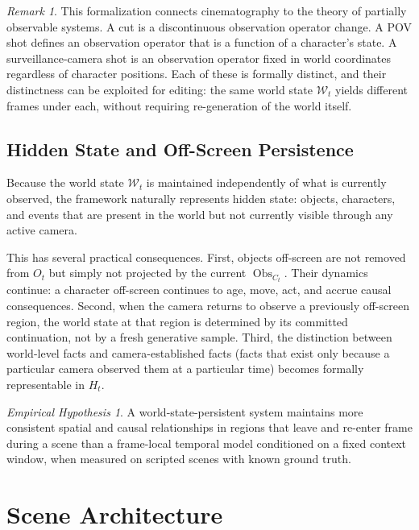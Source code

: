 \documentclass[11pt,a4paper]{article}
\theoremstyle{plain}
\theoremstyle{definition}
\theoremstyle{remark}
\newtheorem{remark}[theorem]{Remark}
\newtheorem{hypothesis}[theorem]{Empirical Hypothesis}
\DeclareMathOperator{\Obs}{Obs}
\begin{document}
\begin{remark}
This formalization connects cinematography to the theory of partially observable systems. A cut is a discontinuous observation operator change. A POV shot defines an observation operator that is a function of a character's state. A surveillance-camera shot is an observation operator fixed in world coordinates regardless of character positions. Each of these is formally distinct, and their distinctness can be exploited for editing: the same world state $\mathcal{W}_t$ yields different frames under each, without requiring re-generation of the world itself.
\end{remark}

\subsection{Hidden State and Off-Screen Persistence}

Because the world state $\mathcal{W}_t$ is maintained independently of what is currently observed, the framework naturally represents hidden state: objects, characters, and events that are present in the world but not currently visible through any active camera.

This has several practical consequences. First, objects off-screen are not removed from $O_t$ but simply not projected by the current $\Obs_{C_t}$. Their dynamics continue: a character off-screen continues to age, move, act, and accrue causal consequences. Second, when the camera returns to observe a previously off-screen region, the world state at that region is determined by its committed continuation, not by a fresh generative sample. Third, the distinction between world-level facts and camera-established facts (facts that exist only because a particular camera observed them at a particular time) becomes formally representable in $H_t$.

\begin{hypothesis}
\label{hyp:offscreen}
A world-state-persistent system maintains more consistent spatial and causal relationships in regions that leave and re-enter frame during a scene than a frame-local temporal model conditioned on a fixed context window, when measured on scripted scenes with known ground truth.
\end{hypothesis}

\section{Scene Architecture}
\label{sec:scene}
\end{document}
